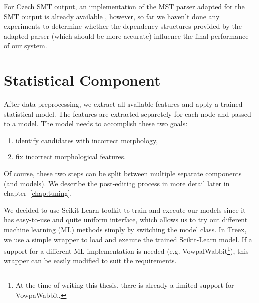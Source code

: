 For Czech SMT output, an implementation of the MST parser adapted for the SMT output
is already available \citep{biblio:RoDuUsingParallel2012}, however, so far we haven't done any experiments
to determine whether the dependency structures provided by the adapted parser (which
should be more accurate) influence the final performance of our system.



\section{Statistical Component}

After data preprocessing, we extract all available features and
apply a trained statistical model. The features are extracted separetely for each node and passed
to a model. The model needs to accomplish these two goals:
\begin{enumerate}
    \item identify candidates with incorrect morphology,
    \item fix incorrect morphological features.
\end{enumerate}
Of course, these two steps can be split between multiple separate components (and models).
We describe the post-editing process in more detail later in chapter~\ref{chap:tuning}.

We decided to use Scikit-Learn \citep{scikit-learn} toolkit to train and execute our models since
it has easy-to-use and quite uniform interface, which allows us to try out different
machine learning (ML) methods simply by switching the model class. In Treex, we use a simple
wrapper to load and execute the trained Scikit-Learn model. If a support for a different ML implementation
is needed (e.g. VowpalWabbit\footnote{At the time of writing this thesis, there is already
a limited support for VowpaWabbit.}), this wrapper can be easily modified to suit the requirements.

